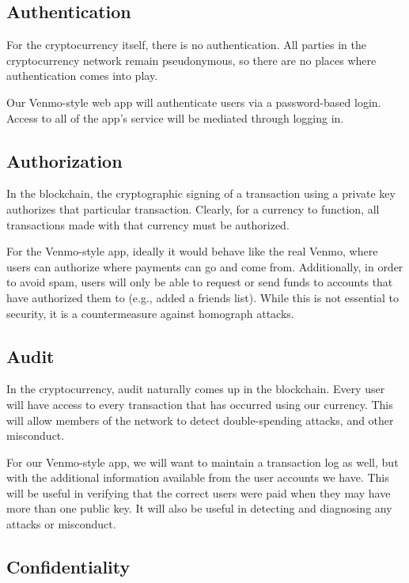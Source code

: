 \documentclass[12pt]{article}
\begin{document}
\subsection{Authentication}

For the cryptocurrency itself, there is no authentication. All parties in the cryptocurrency network remain pseudonymous, so there are no places where authentication comes into play.

Our Venmo-style web app will authenticate users via a password-based login. Access to all of the app's service will be mediated through logging in.

\subsection{Authorization}

In the blockchain, the cryptographic signing of a transaction using a private key authorizes that particular transaction. Clearly, for a currency to function, all transactions made with that currency must be authorized.

For the Venmo-style app, ideally it would behave like the real Venmo, where users can authorize where payments can go and come from.
Additionally, in order to avoid spam, users will only be able to request or send funds to accounts that have authorized them to (e.g., added a friends list).
While this is not essential to security, it is a countermeasure against homograph attacks.

\subsection{Audit}

In the cryptocurrency, audit naturally comes up in the blockchain. Every user will have access to every transaction that has occurred using our currency. This will allow members of the network to detect double-spending attacks, and other misconduct.

For our Venmo-style app, we will want to maintain a transaction log as well, but with the additional information available from the user accounts we have.
This will be useful in verifying that the correct users were paid when they may have more than one public key. It will also be useful in detecting and diagnosing any attacks or misconduct.

\subsection{Confidentiality}
\end{document}
